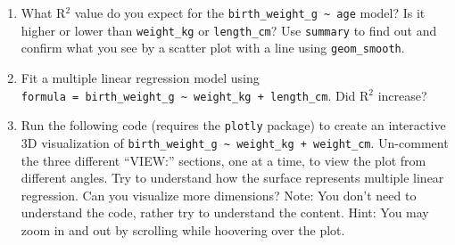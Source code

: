 \documentclass[
  letterpaper,
  DIV=11,
  numbers=noendperiod]{scrreprt}
\providecommand{\tightlist}{%
  \setlength{\itemsep}{0pt}\setlength{\parskip}{0pt}}\usepackage{longtable,booktabs,array}
\begin{document}
\begin{enumerate}
\def\labelenumi{\arabic{enumi}.}
\tightlist
\item
  What R\(^2\) value do you expect for the
  \texttt{birth\_weight\_g\ \textasciitilde{}\ age} model? Is it higher
  or lower than \texttt{weight\_kg} or \texttt{length\_cm}? Use
  \texttt{summary} to find out and confirm what you see by a scatter
  plot with a line using \texttt{geom\_smooth}.
\item
  Fit a multiple linear regression model using
  \texttt{formula\ =\ birth\_weight\_g\ \textasciitilde{}\ weight\_kg\ +\ length\_cm}.
  Did R\(^2\) increase?
\item
  Run the following code (requires the \texttt{plotly} package) to
  create an interactive 3D visualization of
  \texttt{birth\_weight\_g\ \textasciitilde{}\ weight\_kg\ +\ weight\_cm}.
  Un-comment the three different ``VIEW:'' sections, one at a time, to
  view the plot from different angles. Try to understand how the surface
  represents multiple linear regression. Can you visualize more
  dimensions? Note: You don't need to understand the code, rather try to
  understand the content. Hint: You may zoom in and out by scrolling
  while hoovering over the plot.
\end{enumerate}
\end{document}
